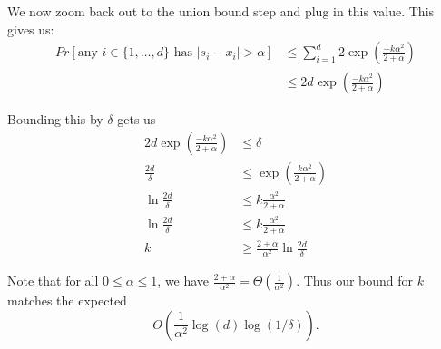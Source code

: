 \documentclass{article}
\newcommand{\abs}[1]{\vert #1 \vert}
\begin{document}
\begin{enumerate}[(a)]
\begin{enumerate}[(i)]
                We now zoom back out to the union bound step and plug in this value.  This gives us:
                \begin{align*} Pr[\text{any }i \in \{1,\ldots,d\}\text{ has }\abs{s_i - x_i} >
                    \alpha] &\le \sum_{i=1}^d 2\exp\left( \frac{-k\alpha^2}{2 + \alpha} \right)  \\
                    &\le 2d\exp\left( \frac{-k\alpha^2}{2 + \alpha} \right) 
                \end{align*}

                Bounding this by $\delta$ gets us
                \begin{align*}
                    2d\exp\left( \frac{-k\alpha^2}{2+\alpha} \right) &\le \delta \\
                    \frac{2d}{\delta} &\le \exp\left( \frac{k\alpha^2}{2+\alpha} \right) \\
                    \ln \frac{2d}{\delta} &\le k\frac{\alpha^2}{2+\alpha} \\
                    \ln \frac{2d}{\delta} &\le k\frac{\alpha^2}{2+\alpha} \\
                    k &\ge \frac{2+\alpha}{\alpha^2} \ln \frac{2d}{\delta}
                \end{align*}

                Note that for all $0 \le \alpha \le 1$, we have $\frac{2+\alpha}{\alpha^2} = \Theta\left(
                \frac{1}{\alpha^2} \right)$.  Thus our bound for $k$ matches the expected
                \[ O\left( \frac{1}{\alpha^2}\log(d)\log(1/\delta)\right). \]
        \end{enumerate}
\end{enumerate}
\end{document}
